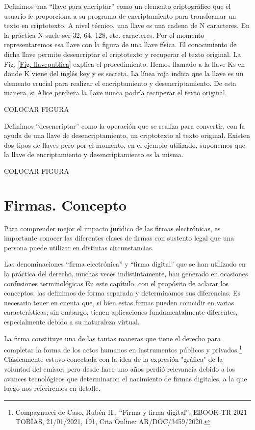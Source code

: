\documentclass[12pt]{report} %
\begin{document}
Definimos una “llave para encriptar” como un elemento criptográfico que el usuario le proporciona a su programa de encriptamiento para transformar un texto en criptotexto. A nivel técnico, una llave es una cadena de N caracteres. En la práctica N suele ser 32, 64, 128, etc. caracteres. Por el momento representaremos esa llave con la figura de una llave física. El conocimiento de dicha llave permite desencriptar el criptotexto y recuperar el texto original. La Fig. \ref{Fig. llavepublica} explica el procedimiento. Hemos llamado a la llave Ks en donde K viene del inglés key y  es secreta. La línea roja indica que la llave es un elemento crucial para realizar el encriptamiento y desencriptamiento. De esta manera, si Alice perdiera la llave nunca podría recuperar el texto original.
 
COLOCAR FIGURA

Definimos “desencriptar” como la operación que se realiza para convertir, con la ayuda de una llave de desencriptamiento, un criptotexto al texto original. Existen dos tipos de llaves pero por el momento, en el ejemplo utilizado, suponemos que la llave de encriptamiento y desencriptamiento es la misma.
 
COLOCAR FIGURA

\section{Firmas. Concepto}

Para comprender mejor el impacto jurídico de las firmas electrónicas, es importante conocer las diferentes clases de firmas con sustento legal que una persona puede utilizar en distintas circunstancias. 

Las denominaciones “firma electrónica” y “firma digital” que se han utilizado en la práctica del derecho, muchas veces indistintamente, han generado en ocasiones confusiones terminológicas En este capítulo, con el propósito de aclarar los conceptos, las definimos de forma separada y determinamos sus diferencias. Es necesario tener en cuenta que, si bien estas firmas pueden coincidir en varias características; sin embargo, tienen aplicaciones fundamentalmente diferentes, especialmente debido a su naturaleza virtual.

La firma constituye una de las tantas maneras que tiene el derecho para completar la forma de los actos humanos en instrumentos públicos y privados.\footnote{Compagnucci de Caso, Rubén H., “Firma y firma digital”, EBOOK-TR 2021 TOBÍAS, 21/01/2021, 191, Cita Online: AR/DOC/3459/2020.}  Clásicamente estuvo conectada con la idea de la expresión "gráfica" de la voluntad del emisor; pero desde hace uno años perdió relevancia debido a los avances tecnológicos que determinaron el nacimiento de firmas digitales, a la que luego nos referiremos en detalle.
\end{document}
